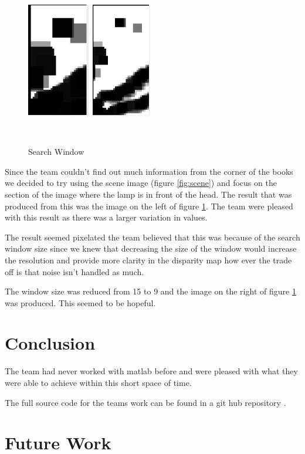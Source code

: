 \documentclass[twocolumn]{article}
\begin{document}
  
\begin{figure}[H]
\centering
  \includegraphics[height=50mm]{Figures/Search_Window_Comparison}
    \caption{Search Window}~\label{fig:Search_Window}
\end{figure} 
Since the team couldn't find out much information from the corner of the books we decided to try using the scene image (figure \ref{fig:scene}) and focus on the section of the image where the lamp is in front of the head. The result that was produced from this was the image on the left of figure \ref{fig:Search_Window}. The team were pleased with this result as there was a larger variation in values. 

The result seemed pixelated the team believed that this was because of the search window size since we knew that decreasing the size of the window would increase the resolution and provide more clarity in the disparity map how ever the trade off is that noise isn't handled as much. 

The window size was reduced from 15 to 9 and the image on the right of figure \ref{fig:Search_Window} was produced. This seemed to be hopeful. 


\section{Conclusion}
\vspace{-1ex}

The team had never worked with matlab before and were pleased with what they were able to achieve within this short space of time.
 

The full source code for the teams work can be found in a git hub repository \cite{githublink}.

\section{Future Work} 
\vspace{-1ex}
\end{document}
